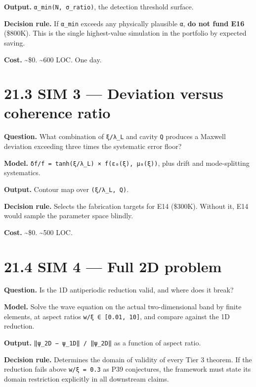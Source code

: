 \documentclass[
  11pt]{report}
\begin{document}
\textbf{Output.} \texttt{α\_min(N,\ σ\_ratio)}, the detection threshold
surface.

\textbf{Decision rule.} If \texttt{α\_min} exceeds any physically
plausible \texttt{α}, \textbf{do not fund E16} (\$800K). This is the
single highest-value simulation in the portfolio by expected saving.

\textbf{Cost.} \textasciitilde\$0. \textasciitilde600 LOC. One day.

\hypertarget{sim-3-deviation-versus-coherence-ratio}{%
\section{21.3 SIM 3 --- Deviation versus coherence
ratio}\label{sim-3-deviation-versus-coherence-ratio}}

\textbf{Question.} What combination of \texttt{ξ/λ\_L} and cavity
\texttt{Q} produces a Maxwell deviation exceeding three times the
systematic error floor?

\textbf{Model.} \texttt{δf/f\ =\ tanh(ξ/λ\_L)\ ×\ f(ε₀(ξ),\ μ₀(ξ))},
plus drift and mode-splitting systematics.

\textbf{Output.} Contour map over \texttt{(ξ/λ\_L,\ Q)}.

\textbf{Decision rule.} Selects the fabrication targets for E14
(\$300K). Without it, E14 would sample the parameter space blindly.

\textbf{Cost.} \textasciitilde\$0. \textasciitilde500 LOC.

\hypertarget{sim-4-full-2d-problem}{%
\section{21.4 SIM 4 --- Full 2D problem}\label{sim-4-full-2d-problem}}

\textbf{Question.} Is the 1D antiperiodic reduction valid, and where
does it break?

\textbf{Model.} Solve the wave equation on the actual two-dimensional
band by finite elements, at aspect ratios
\texttt{w/ξ\ ∈\ {[}0.01,\ 10{]}}, and compare against the 1D reduction.

\textbf{Output.} \texttt{‖ψ\_2D\ −\ ψ\_1D‖\ /\ ‖ψ\_2D‖} as a function of
aspect ratio.

\textbf{Decision rule.} Determines the domain of validity of every Tier
3 theorem. If the reduction fails above \texttt{w/ξ\ =\ 0.3} as P39
conjectures, the framework must state its domain restriction explicitly
in all downstream claims.
\end{document}
